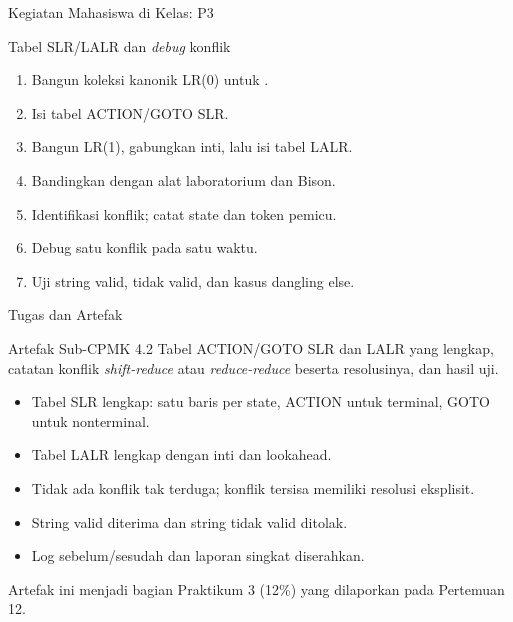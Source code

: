 \documentclass[aspectratio=169,10pt,t]{beamer}
\begin{document}
\begin{frame}{Kegiatan Mahasiswa di Kelas: P3}
  \begin{block}{Tabel SLR/LALR dan \textit{debug} konflik}
    \footnotesize
    \begin{enumerate}
      \setlength{\itemsep}{1pt}
      \item Bangun koleksi kanonik LR(0) untuk
            .
      \item Isi tabel ACTION/GOTO SLR.
      \item Bangun LR(1), gabungkan inti, lalu isi tabel LALR.
      \item Bandingkan dengan alat laboratorium dan Bison.
      \item Identifikasi konflik; catat state dan token pemicu.
      \item Debug satu konflik pada satu waktu.
      \item Uji string valid, tidak valid, dan kasus dangling else.
    \end{enumerate}
  \end{block}
\end{frame}

\begin{frame}{Tugas dan Artefak}
  \begin{block}{Artefak Sub-CPMK 4.2}
    Tabel ACTION/GOTO SLR dan LALR yang lengkap, catatan konflik
    \textit{shift-reduce} atau \textit{reduce-reduce} beserta
    resolusinya, dan hasil uji.
  \end{block}

  \small
  \begin{itemize}
    \item Tabel SLR lengkap: satu baris per state, ACTION untuk
          terminal, GOTO untuk nonterminal.
    \item Tabel LALR lengkap dengan inti dan lookahead.
    \item Tidak ada konflik tak terduga; konflik tersisa memiliki
          resolusi eksplisit.
    \item String valid diterima dan string tidak valid ditolak.
    \item Log sebelum/sesudah dan laporan singkat diserahkan.
  \end{itemize}

  \vspace{3pt}
  {\footnotesize\color{ubbblue!75}Artefak ini menjadi bagian
  Praktikum 3 (12\%) yang dilaporkan pada Pertemuan 12.}
\end{frame}
\end{document}

